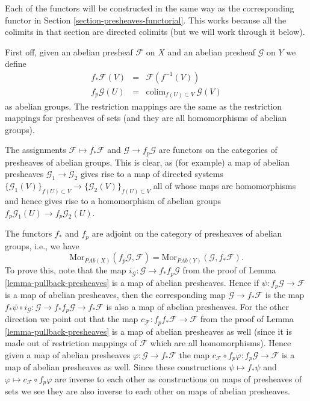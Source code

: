\medskip\noindent
Each of the functors will be constructed in the same
way as the corresponding functor in
Section \ref{section-presheaves-functorial}.
This works because all the colimits in that section
are directed colimits (but we will work through it below).

\medskip\noindent
First off, given an abelian presheaf $\mathcal{F}$ on $X$ and
an abelian presheaf $\mathcal{G}$ on $Y$ we define
\begin{eqnarray*}
f_*\mathcal{F}(V) & = & \mathcal{F}(f^{-1}(V)) \\
f_p\mathcal{G}(U) & = & \text{colim}_{f(U) \subset V}\ \mathcal{G}(V)
\end{eqnarray*}
as abelian groups. The restriction mappings are the same as
the restriction mappings for presheaves of sets (and they are
all homomorphisms of abelian groups).

\medskip\noindent
The assignments $\mathcal{F} \mapsto f_*\mathcal{F}$ and
$\mathcal{G} \to f_p\mathcal{G}$ are functors on
the categories of presheaves of abelian groups.
This is clear, as (for example) a map of abelian presheaves
$\mathcal{G}_1 \to \mathcal{G}_2$ gives rise to a map of
directed systems
$\{\mathcal{G}_1(V)\}_{f(U) \subset V} \to
\{\mathcal{G}_2(V)\}_{f(U) \subset V}$
all of whose maps are homomorphisms
and hence gives rise to a homomorphism of abelian groups
$f_p\mathcal{G}_1(U) \to f_p\mathcal{G}_2(U)$.

\medskip\noindent
The functors $f_*$ and $f_p$ are adjoint on the
category of presheaves of abelian groups, i.e., we have
$$
\text{Mor}_{\textit{PAb}(X)}(f_p\mathcal{G}, \mathcal{F})
=
\text{Mor}_{\textit{PAb}(Y)}(\mathcal{G}, f_*\mathcal{F}).
$$
To prove this, note that the map
$i_\mathcal{G} : \mathcal{G} \to f_* f_p\mathcal{G}$ from the proof
of Lemma \ref{lemma-pullback-presheaves}
is a map of abelian presheaves. Hence if
$\psi : f_p\mathcal{G} \to \mathcal{F}$
is a map of abelian presheaves, then the corresponding map
$\mathcal{G} \to f_*\mathcal{F}$ is the map
$f_*\psi \circ i_\mathcal{G} :
\mathcal{G} \to f_* f_p \mathcal{G} \to f_* \mathcal{F}$
is also a map of abelian presheaves. For the other direction
we point out that the map
$c_{\mathcal{F}} : f_p f_* \mathcal{F} \to \mathcal{F}$
from the proof of Lemma \ref{lemma-pullback-presheaves} is a
map of abelian presheaves as well (since it is made out of restriction
mappings of $\mathcal{F}$ which are all homomorphisms). Hence
given a map of abelian presheaves $\varphi : \mathcal{G} \to f_*\mathcal{F}$
the map
$c_{\mathcal{F}} \circ f_p\varphi : f_p\mathcal{G} \to \mathcal{F}$
is a map of abelian presheaves as well. Since these constructions
$\psi \mapsto f_*\psi$ and $\varphi \mapsto c_{\mathcal{F}} \circ f_p\varphi$
are inverse to each other as constructions on maps of presheaves of sets
we see they are also inverse to each other on maps of abelian presheaves.

